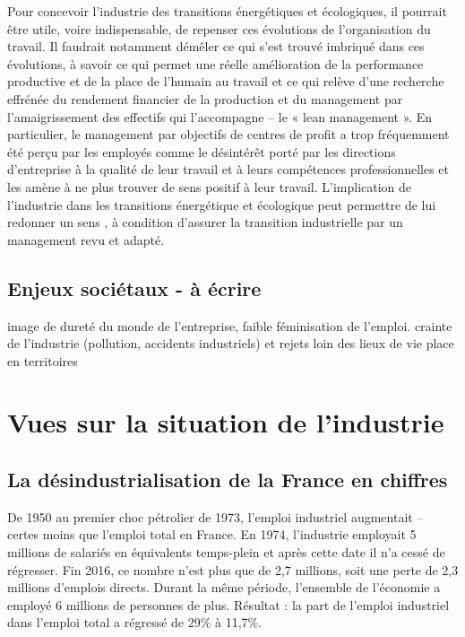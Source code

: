 \documentclass[a4paper]{article}
\begin{document}
Pour concevoir l’industrie des transitions énergétiques et écologiques, il pourrait être utile, voire indispensable, de repenser ces évolutions de l’organisation du travail. Il faudrait notamment démêler ce qui s’est trouvé imbriqué dans ces évolutions, à savoir ce qui permet une réelle amélioration de la performance productive et de la place de l’humain au travail et ce qui relève d’une recherche effrénée du rendement financier de la production et du management par l’amaigrissement des effectifs qui l’accompagne – le « lean management ».  En particulier, le management par objectifs de centres de profit a trop fréquemment été perçu par les employés comme le désintérêt porté par les directions d’entreprise à la qualité de leur travail et à leurs compétences professionnelles et les amène à ne plus trouver de sens positif à leur travail. L’implication de l’industrie dans les transitions énergétique et écologique peut permettre de lui redonner un sens , à condition d’assurer la transition industrielle par un management revu et adapté. 

\subsection{Enjeux sociétaux - à écrire}
\begin{textit}
image de dureté du monde de l’entreprise, faible féminisation de l’emploi.
crainte de l’industrie (pollution, accidents industriels) et rejets loin des lieux de vie
place en territoires
\end{textit}


\section{Vues sur la situation de l'industrie}
\subsection{La désindustrialisation de la France en chiffres}
De 1950 au premier choc pétrolier de 1973, l’emploi industriel augmentait – certes moins que l’emploi total en France. En 1974, l’industrie employait 5 millions de salariés en équivalents temps-plein et après cette date il n’a cessé de régresser. Fin 2016, ce nombre n’est plus que de 2,7 millions, soit une perte de 2,3 millions d’emplois directs. Durant la même période, l’ensemble de l’économie a employé 6 millions de personnes de plus. Résultat : la part de l’emploi industriel dans l’emploi total a régressé de 29\% à  11,7\%.
\end{document}
